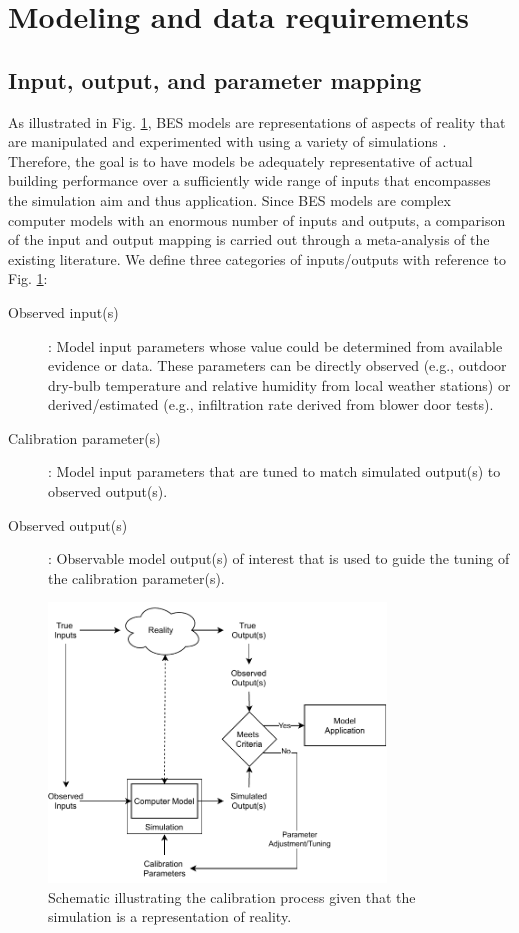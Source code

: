 \documentclass[review]{elsarticle}
\begin{document}
\section{Modeling and data requirements}

\subsection{Input, output, and parameter mapping}

As illustrated in Fig. \ref{fig:morphism}, BES models are representations of aspects of reality that are manipulated and experimented with using a variety of simulations \cite{augenbroe2019role, aumann2007methodology}. Therefore, the goal is to have models be adequately representative of actual building performance over a sufficiently wide range of inputs that encompasses the simulation aim and thus application. Since BES models are complex computer models with an enormous number of inputs and outputs, a comparison of the input and output mapping is carried out through a meta-analysis of the existing literature. We define three categories of inputs/outputs with reference to Fig. \ref{fig:morphism}:
\begin{description}
    \item[Observed input(s)]: Model input parameters whose value could be determined from available evidence or data. These parameters can be directly observed (e.g., outdoor dry-bulb temperature and relative humidity from local weather stations) or derived/estimated (e.g., infiltration rate derived from blower door tests).
    \item[Calibration parameter(s)]: Model input parameters that are tuned to match simulated output(s) to observed output(s).
    \item[Observed output(s)]: Observable model output(s) of interest that is used to guide the tuning of the calibration parameter(s). 
\end{description}

\begin{figure}[!h]
\centering
\includegraphics[width=0.8\textwidth]{figures/morphism.pdf}
\caption{Schematic illustrating the calibration process given that the simulation is a representation of reality.}
\label{fig:morphism}
\end{figure}
\end{document}
